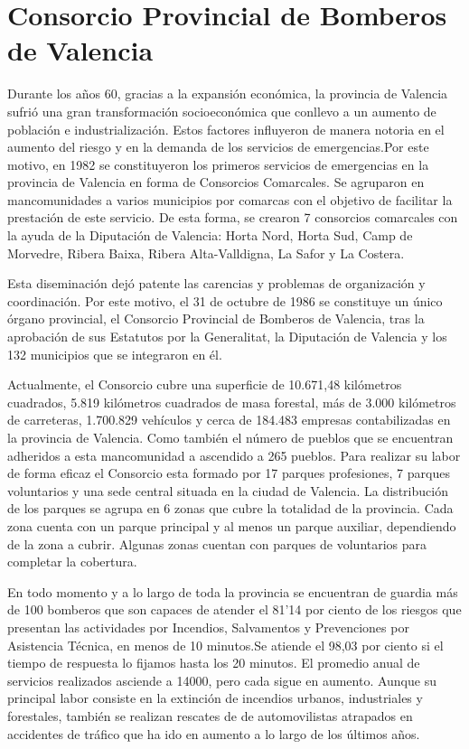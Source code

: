 \documentclass[12pt,a4paper,titlepage,twoside]{report}
\begin{document}
\section{Consorcio Provincial de Bomberos de Valencia}
Durante los años 60, gracias a la expansión económica, la provincia de Valencia sufrió una gran transformación socioeconómica que conllevo a un aumento de población e industrialización. Estos factores influyeron de manera notoria en el aumento del riesgo y en la demanda de los servicios de emergencias.Por este motivo, en 1982 se constituyeron los primeros servicios de emergencias en la provincia de Valencia en forma de Consorcios Comarcales. Se agruparon en mancomunidades a varios municipios por comarcas con el objetivo de facilitar la prestación de este servicio. De esta forma, se crearon 7 consorcios comarcales con la ayuda de la Diputación de Valencia: Horta Nord, Horta Sud, Camp de Morvedre, Ribera Baixa, Ribera Alta-Valldigna, La Safor y La Costera.
\par
Esta diseminación dejó patente las carencias y problemas de organización y coordinación. Por este motivo, el 31 de octubre de 1986 se constituye un único órgano provincial, el Consorcio Provincial de Bomberos de Valencia, tras la aprobación de sus Estatutos por la Generalitat, la Diputación de Valencia y los 132 municipios que se integraron en él.
\par
Actualmente, el Consorcio cubre una superficie de 10.671,48 kilómetros cuadrados, 5.819 kilómetros cuadrados de masa forestal, más de 3.000 kilómetros de carreteras, 1.700.829 vehículos y cerca de 184.483 empresas contabilizadas en la provincia de Valencia. Como también el número de pueblos que se encuentran adheridos a esta mancomunidad a ascendido a 265 pueblos. Para realizar su labor de forma eficaz el Consorcio esta formado por 17 parques profesiones, 7 parques voluntarios y una sede central situada en la ciudad de Valencia. La distribución de los parques se agrupa en 6 zonas que cubre la totalidad de la provincia. Cada zona cuenta con un parque principal y al menos un parque auxiliar, dependiendo de la zona a cubrir. Algunas zonas cuentan con parques de voluntarios para completar la cobertura.
\par
En todo momento y a lo largo de toda la provincia se encuentran de guardia más de 100 bomberos que son capaces de atender el 81'14 por ciento de los riesgos que presentan las actividades por Incendios, Salvamentos y Prevenciones por Asistencia Técnica, en menos de 10 minutos.Se atiende el 98,03 por ciento si el tiempo de respuesta lo fijamos hasta los 20 minutos.
El promedio anual de servicios realizados asciende a 14000, pero cada sigue en aumento. Aunque su principal labor consiste en la extinción de incendios urbanos, industriales y forestales, también se realizan rescates de de automovilistas atrapados en accidentes de tráfico que ha ido en aumento a lo largo de los últimos años. \cite{web1} \cite{web2}
\end{document}
